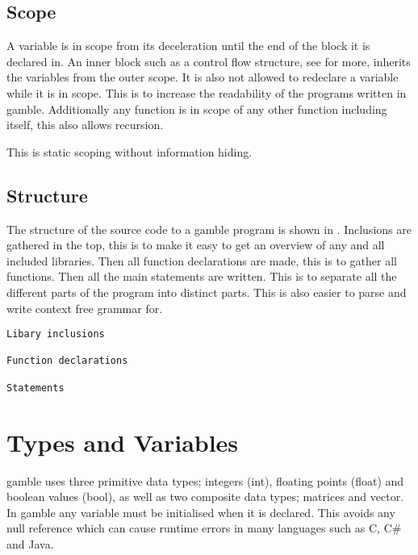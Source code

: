 \subsection*{Scope}
A variable is in scope from its deceleration until the end of the block it is declared in.
An inner block such as a control flow structure, see  for more, inherits the variables from the outer scope. 
It is also not allowed to redeclare a variable while it is in scope. 
This is to increase the readability of the programs written in \gls{gamble}.
Additionally any function is in scope of any other function including itself, this also allows recursion. 

This is static scoping without information hiding. 

\subsection*{Structure} 
The structure of the source code to a \gls{gamble} program is shown in .
Inclusions are gathered in the top, this is to make it easy to get an overview of any and all included libraries. 
Then all function declarations are made, this is to gather all functions. 
Then all the main statements are written. 
This is to separate all the different parts of the program into distinct parts. 
This is also easier to parse and write context free grammar for.  

\begin{lstlisting}[caption={Source code file layout in \gls{gamble}},frame=tlrb,label={lst:Structure}, numbers=none]
Libary inclusions

Function declarations

Statements
\end{lstlisting}

\section{Types and Variables} \label{sec:Types}
\gls{gamble} uses three primitive data types; integers (int), floating points (float) and boolean values (bool), as well as two composite data types; matrices and vector. 
In \gls{gamble} any variable must be initialised when it is declared. 
This avoids any null reference which can cause runtime errors in many languages such as C, C\# and Java. 

